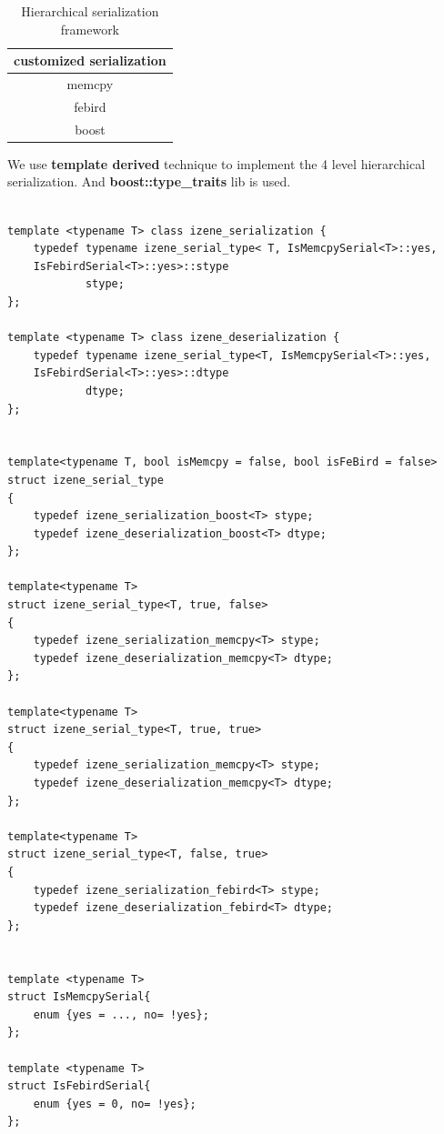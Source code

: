 \documentclass[a4paper,10pt]{article}
\begin{document}
\begin{table} \label{table:4}
\centering \caption{Hierarchical serialization framework}
\begin{tabular}{|c|} \hline
customized serialization\\ \hline
memcpy \\ \hline
febird \\ \hline
boost  \\ \hline
\end{tabular}
\end{table}

 We use \textbf{template derived} technique to implement the 4
level hierarchical serialization. And \textbf{boost::type\_traits}
lib is used.
\begin{lstlisting}

template <typename T> class izene_serialization {
    typedef typename izene_serial_type< T, IsMemcpySerial<T>::yes,
    IsFebirdSerial<T>::yes>::stype
            stype;
};

template <typename T> class izene_deserialization {
    typedef typename izene_serial_type<T, IsMemcpySerial<T>::yes,
    IsFebirdSerial<T>::yes>::dtype
            dtype;
};


template<typename T, bool isMemcpy = false, bool isFeBird = false>
struct izene_serial_type
{
    typedef izene_serialization_boost<T> stype;
    typedef izene_deserialization_boost<T> dtype;
};

template<typename T>
struct izene_serial_type<T, true, false>
{
    typedef izene_serialization_memcpy<T> stype;
    typedef izene_deserialization_memcpy<T> dtype;
};

template<typename T>
struct izene_serial_type<T, true, true>
{
    typedef izene_serialization_memcpy<T> stype;
    typedef izene_deserialization_memcpy<T> dtype;
};

template<typename T>
struct izene_serial_type<T, false, true>
{
    typedef izene_serialization_febird<T> stype;
    typedef izene_deserialization_febird<T> dtype;
};


template <typename T>
struct IsMemcpySerial{
    enum {yes = ..., no= !yes};
};

template <typename T>
struct IsFebirdSerial{
    enum {yes = 0, no= !yes};
};


\end{lstlisting}
\end{document}
